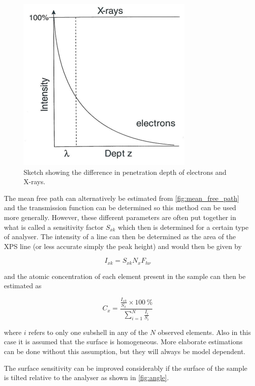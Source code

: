 \begin{figure}[h!]
	\begin{center}
	\includegraphics[scale=3]{figures/04_23.png}
	\caption{Sketch showing the difference in penetration depth of electrons and X-rays.}
	\label{fig:pendepth}
	\end{center}
\end{figure}

The mean free path can alternatively be estimated from \autoref{fig:mean_free_path} and the transmission function can be determined so this method can be used more generally. However, these different parameters are often put together in what is called a sensitivity factor $S_{xk}$ which then is determined for a certain type of analyser. The intensity of a line can then be determined as the area of the XPS line (or less accurate simply the peak height) and would then be given by

\begin{equation}
I_{xk}=S_{xk}N_xF_{h\nu}
\end{equation}

and the atomic concentration of each element present in the sample can then be estimated as

\begin{equation}
C_{x}=\frac{\frac{I_{xk}}{S_x}\times\SI{100}{\percent}}{\sum_{i=1}^N\frac{I_i}{S_i}}
\end{equation}

where $i$ refers to only one subshell in any of the $N$ observed elements. Also in this case it is assumed that the surface is homogeneous. More elaborate estimations can be done without this assumption, but they will always be model dependent.

The surface sensitivity can be improved considerably if the surface of the  sample is tilted relative to the analyser as shown in \autoref{fig:angle}.

